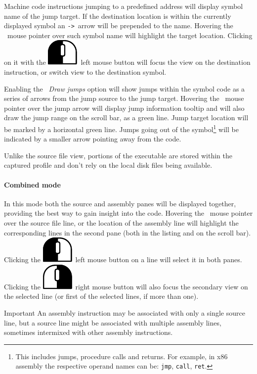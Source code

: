 \documentclass[hidelinks,titlepage,a4paper]{article}
\newcommand{\LMB}{\includegraphics[height=.8\baselineskip]{icons/lmb}}
\newcommand{\RMB}{\includegraphics[height=.8\baselineskip]{icons/rmb}}
\begin{document}
Machine code instructions jumping to a predefined address will display symbol name of the jump target. If the destination location is within the currently displayed symbol an \texttt{->}~arrow will be prepended to the name. Hovering the \faMousePointer{}~mouse pointer over such symbol name will highlight the target location. Clicking on it with the \LMB{}~left mouse button will focus the view on the destination instruction, or switch view to the destination symbol.

Enabling the \emph{\faShare{}~Draw jumps} option will show jumps within the symbol code as a series of arrows from the jump source to the jump target. Hovering the \faMousePointer{}~mouse pointer over the jump arrow will display jump information tooltip and will also draw the jump range on the scroll bar, as a green line. Jump target location will be marked by a horizontal green line. Jumps going out of the symbol\footnote{This includes jumps, procedure calls and returns. For example, in x86 assembly the respective operand names can be: \texttt{jmp}, \texttt{call}, \texttt{ret}.} will be indicated by a smaller arrow pointing away from the code.

Unlike the source file view, portions of the executable are stored within the captured profile and don't rely on the local disk files being available.

\paragraph{Combined mode}

In this mode both the source and assembly panes will be displayed together, providing the best way to gain insight into the code. Hovering the \faMousePointer{}~mouse pointer over the source file line, or the location of the assembly line will highlight the corresponding lines in the second pane (both in the listing and on the scroll bar). Clicking the \LMB{}~left mouse button on a line will select it in both panes. Clicking the \RMB{}~right mouse button will also focus the secondary view on the selected line (or first of the selected lines, if more than one).

\begin{bclogo}[
noborder=true,
couleur=black!5,
logo=\bcbombe
]{Important}
An assembly instruction may be associated with only a single source line, but a source line might be associated with multiple assembly lines, sometimes intermixed with other assembly instructions.
\end{bclogo}
\end{document}
